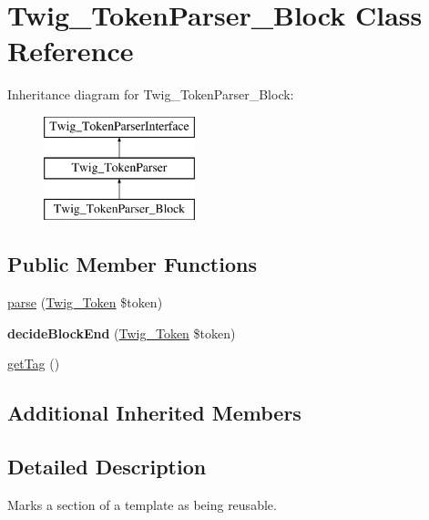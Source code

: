 \hypertarget{classTwig__TokenParser__Block}{}\section{Twig\+\_\+\+Token\+Parser\+\_\+\+Block Class Reference}
\label{classTwig__TokenParser__Block}
Inheritance diagram for Twig\+\_\+\+Token\+Parser\+\_\+\+Block\+:\begin{figure}[H]
\begin{center}
\leavevmode
\includegraphics[height=3.000000cm]{classTwig__TokenParser__Block}
\end{center}
\end{figure}
\subsection*{Public Member Functions}
\begin{DoxyCompactItemize}
\item 
\hyperlink{classTwig__TokenParser__Block_a34b09c0e38cdc5eeae858df26d703289}{parse} (\hyperlink{classTwig__Token}{Twig\+\_\+\+Token} \$token)
\item 
{\bfseries decide\+Block\+End} (\hyperlink{classTwig__Token}{Twig\+\_\+\+Token} \$token)\hypertarget{classTwig__TokenParser__Block_ac4175f54c6b2c977a5479bd4d5ea7ad5}{}\label{classTwig__TokenParser__Block_ac4175f54c6b2c977a5479bd4d5ea7ad5}

\item 
\hyperlink{classTwig__TokenParser__Block_a2d39d9257d35de1190c855c8dd6bf7d2}{get\+Tag} ()
\end{DoxyCompactItemize}
\subsection*{Additional Inherited Members}


\subsection{Detailed Description}
Marks a section of a template as being reusable.


